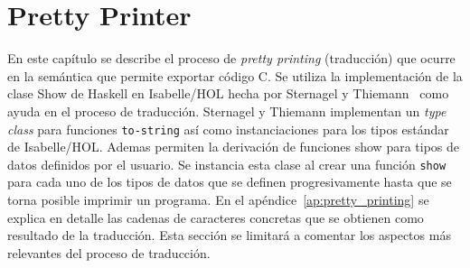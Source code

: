\chapter{Pretty Printer}\label{chapter:pretty}

En este capítulo se describe el proceso de \textit{pretty printing} (traducción) que ocurre en la semántica que permite exportar código C.
Se utiliza la implementación de la clase Show de Haskell en Isabelle/HOL hecha por Sternagel y Thiemann~\citeyearpar{Show-AFP} como ayuda en el proceso de traducción.
Sternagel y Thiemann implementan un \textit{type class} para funciones \verb|to-string| así como instanciaciones para los tipos estándar de Isabelle/HOL.
Ademas permiten la derivación de funciones show para tipos de datos definidos por el usuario.
Se instancia esta clase al crear una función \verb|show| para cada uno de los tipos de datos que se definen progresivamente hasta que se torna posible imprimir un programa.
En el apéndice~\ref{ap:pretty_printing} se explica en detalle las cadenas de caracteres concretas que se obtienen como resultado de la traducción.
Esta sección se limitará a comentar los aspectos más relevantes del proceso de traducción.
\begin{comment}
Las siguientes secciones explicarán en detalle las cadenas de caracteres concretos que se obtienen como resultado de la traducción.
\end{comment}

